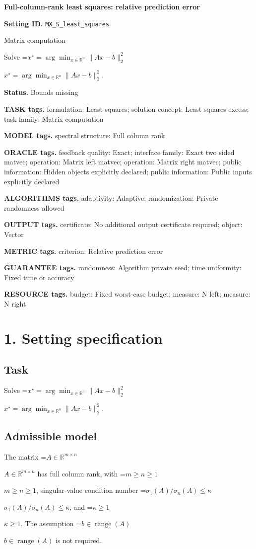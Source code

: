 \documentclass[10pt,a4paper]{article}
\newcommand{\AtlasMath}[1]{\par\begingroup\centering\setbox0=\hbox{$\displaystyle #1$}\ifdim\wd0>1.4\linewidth\typeout{ATLAS WIDE FORMULA: \the\wd0}\fi\ifdim\wd0>\linewidth\resizebox{\linewidth}{!}{\box0}\else\box0\fi\par\endgroup}
\newcommand{\AtlasInlineMath}[1]{\begingroup\setbox0=\hbox{$#1$}\ifdim\wd0>.4\linewidth\endgroup\AtlasMath{#1}\else\endgroup$#1$\fi}
\begin{document}
\raggedright

{\LARGE\bfseries\sffamily\color{AtlasNavy} Full-column-rank least squares: relative prediction error\par}\vspace{5pt}
\textbf{Setting ID.} \texttt{MX\_\allowbreak{}S\_\allowbreak{}least\_\allowbreak{}squares}

Matrix computation

Solve \AtlasInlineMath{x^\star=\arg\min_{x\in\mathbb R^n}\|Ax-b\|_2^2}.

\textbf{Status.} Bounds missing

\textbf{TASK tags.} formulation: Least squares; solution concept: Least squares excess; task family: Matrix computation

\textbf{MODEL tags.} spectral structure: Full column rank

\textbf{ORACLE tags.} feedback quality: Exact; interface family: Exact two sided matvec; operation: Matrix left matvec; operation: Matrix right matvec; public information: Hidden objects explicitly declared; public information: Public inputs explicitly declared

\textbf{ALGORITHMS tags.} adaptivity: Adaptive; randomization: Private randomness allowed

\textbf{OUTPUT tags.} certificate: No additional output certificate required; object: Vector

\textbf{METRIC tags.} criterion: Relative prediction error

\textbf{GUARANTEE tags.} randomness: Algorithm private seed; time uniformity: Fixed time or accuracy

\textbf{RESOURCE tags.} budget: Fixed worst-case budget; measure: N left; measure: N right

\section{1. Setting specification}
\subsection{Task}
Solve \AtlasInlineMath{x^\star=\arg\min_{x\in\mathbb R^n}\|Ax-b\|_2^2}.

\subsection{Admissible model}
The matrix \AtlasInlineMath{A\in\mathbb{R}^{m\times n}} has full column rank, with \AtlasInlineMath{m\ge n\ge1}, singular-value condition number \AtlasInlineMath{\sigma_1(A)/\sigma_n(A)\le\kappa}, and \AtlasInlineMath{\kappa\ge1}. The assumption \AtlasInlineMath{b\in\operatorname{range}(A)} is not required.
\end{document}
